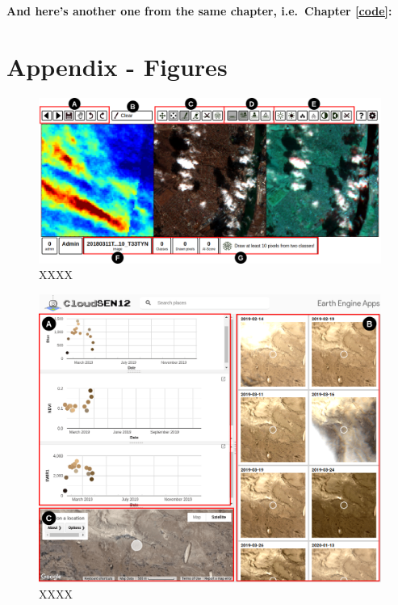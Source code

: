 \documentclass[a4paper, nobind]{templates/cdethesis}
\newcommand*{\bibtitle}{Bibliography}
\begin{document}
\textbf{And here's another one from the same chapter, i.e.~Chapter \ref{code}:}

\hypertarget{appendix---figures}{%
\chapter{Appendix - Figures}\label{appendix---figures}}

\setcounter{figure}{0}
\makeatletter 
\renewcommand{\thefigure}{S\@arabic\c@figure}
\makeatother

\begin{figure}[!h]
    \centering
    \includegraphics[width=1\linewidth]{figures/extra/figureS2.png}
    \caption{XXXX}
    \label{fig:figureS02}
\end{figure}

\begin{figure}[!h]
    \centering
    \includegraphics[width=1\linewidth]{figures/extra/figureS3.png}
    \caption{XXXX}
    \label{fig:figureS03}
\end{figure}


\setlength{\baselineskip}{0pt} %

{\renewcommand*\MakeUppercase[1]{#1}%
\printbibliography[heading=bibintoc,title={\bibtitle}]}
\end{document}
